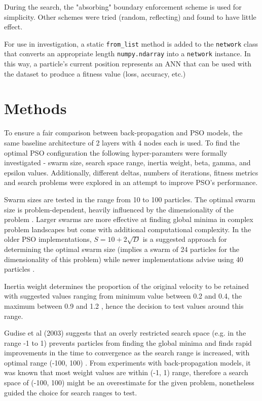 \documentclass[12pt]{article}
\begin{document}
During the search, the "absorbing" \cite{Chu} boundary enforcement scheme is used
for simplicity. Other schemes were tried (random, reflecting) and found to have
little effect.

For use in investigation, a static \texttt{from\_list} method is added to
the \texttt{network} class that converts an appropriate length \texttt{numpy.ndarray}
into a \texttt{network} instance. In this way, a particle's current position
represents an ANN that can be used with the dataset to produce a fitness value (loss, accuracy, etc.)


\vspace{-1.5em}
\section{Methods}

To ensure a fair comparison between back-propagation and PSO models, the same baseline architecture of 2 layers with 4 nodes each is used. To find the optimal PSO configuration the following hyper-paramters were formally investigated - swarm size, search space range, inertia weight, beta, gamma, and epsilon values. Additionally, different deltas, numbers of iterations, fitness metrics and search problems were explored in an attempt to improve PSO's performance.

Swarm sizes are tested in the range from 10 to 100 particles. The optimal swarm size is problem-dependent, heavily influenced by the dimensionality of the problem \cite{Razee}. Larger swarms are more effective at finding global minima in complex problem landscapes but come with additional computational complexity. In the older PSO implementations, \(S = 10 + 2\sqrt{D}\) is a suggested approach for determining the optimal swarm size (implies a swarm of 24 particles for the dimensionality of this problem) while newer implementations advise using 40 particles \cite{Clerc}.

Inertia weight determines the proportion of the original velocity to be retained with suggested values ranging from minimum value between 0.2 and 0.4, the maximum between 0.9 and 1.2 \cite{Razee} \cite{Gudise}, hence the decision to test values around this range.

Gudise et al (2003) suggests that an overly restricted search space (e.g. in the range -1 to 1) prevents particles from finding the global minima and finds rapid improvements in the time to convergence as the search range is increased, with optimal range (-100, 100) \cite{Gudise}. From experiments with back-propagation models, it was known that most weight values are within (-1, 1) range, therefore a search space of (-100, 100) might be an overestimate for the given problem, nonetheless guided the choice for search ranges to test.
\end{document}
